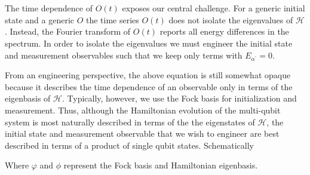 \noindent The time dependence of $O(t)$ exposes our central challenge.
For a generic initial state and a generic $\hat{O}$ the time series $O(t)$ does not isolate the eigenvalues of $\mathcal{H}$.
Instead, the Fourier transform of $O(t)$ reports all energy differences in the spectrum.
In order to isolate the eigenvalues we must engineer the initial state and measurement observables such that we keep only terms with $E_{\alpha^{\prime}}=0$.

From an engineering perspective,
the above equation is still somewhat opaque because it describes the time dependence of an observable only in terms of the eigenbasis of $\mathcal{H}$.
Typically, however, we use the Fock basis for initialization and measurement.
Thus, although the Hamiltonian evolution of the multi-qubit system is most naturally described in terms of the the eigenstates of $\mathcal{H}$,
the initial state and measurement observable that we wish to engineer are best described in terms of a product of single qubit states.
Schematically
\begin{center}
\end{center}
Where $\varphi$ and $\phi$ represent the Fock basis and Hamiltonian eigenbasis.


